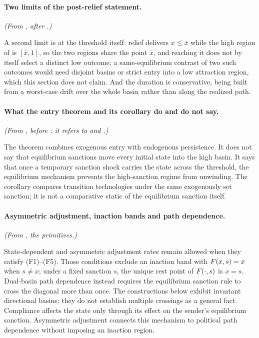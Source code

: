\paragraph{Two limits of the post-relief statement.} \emph{(From , after .)}

A second limit is at
the threshold itself: relief
delivers $x\le\bar x$ while the high region of  is
$[\bar x,1]$, so the two regions share the point $\bar x$, and reaching it
does not by itself select a distinct low outcome; a same-equilibrium
contrast of two such outcomes would need disjoint basins or strict entry into a
low attraction region, which this section does not claim. And the duration
is conservative, being built from a worst-case drift over the whole basin
rather than along the realized path.

\paragraph{What the entry theorem and its corollary do and do not say.} \emph{(From , before ; it refers to  and .)}

The theorem combines exogenous entry with endogenous persistence. It
does not say that equilibrium sanctions move every initial state into
the high basin. It says that once a temporary sanction shock carries the state across the
threshold, the equilibrium mechanism prevents the high-sanction regime
from unwinding. The corollary compares transition technologies under the
same exogenously set sanction; it is not a comparative static of the equilibrium
sanction itself.

\paragraph{Asymmetric adjustment, inaction bands and path dependence.} \emph{(From , the primitives.)}

State-dependent and asymmetric adjustment rates remain allowed when
they satisfy \textup{(F1)--(F5)}. Those conditions exclude an inaction
band with $F(x,s)=x$ when $s\ne x$; under a fixed sanction $s$, the unique
rest point of $F(\cdot,s)$ is $x=s$. Dual-basin path dependence instead requires the equilibrium sanction
rule to cross the diagonal more than once. The constructions below
exhibit invariant directional basins; they do not establish multiple
crossings as a general fact.
Compliance affects the state only through its effect on the sender's
equilibrium sanction. Asymmetric adjustment connects this mechanism to
political path dependence \citep{Pierson2000} without imposing an
inaction region.

